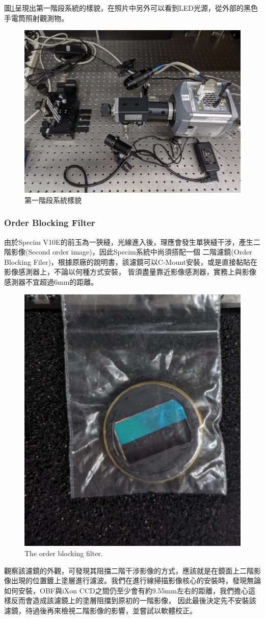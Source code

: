 \documentclass[12pt]{article}
\begin{document}
圖\ref{figure: 1 stage setup}呈現出第一階段系統的樣貌，在照片中另外可以看到LED光源，從外部的黑色手電筒照射觀測物。
\begin{figure}[h]
    \centering
    \includegraphics[width=0.65\linewidth]{PXL_20210723_094307842.jpg}
    \caption{第一階段系統樣貌}
    \label{figure: 1 stage setup}
\end{figure}

\subsubsection{Order Blocking Filter} \label{sec: OBF}
由於Specim V10E的前玉為一狹縫，光線進入後，理應會發生單狹縫干涉，產生二階影像(Second order image)，因此Specim系統中尚須搭配一個
二階濾鏡(Order Blocking Filer)，根據原廠的說明書，該濾鏡可以C-Mount安裝，或是直接黏貼在影像感測器上，不論以何種方式安裝，
皆須盡量靠近影像感測器，實務上與影像感測器不宜超過6mm的距離\cite{manual}。
\begin{figure}[h]
    \centering
    \includegraphics[width=0.5\linewidth]{PXL_20210723_094341395.jpg}
    \caption{The order blocking filter.}
    \label{figure: obf}
\end{figure}
觀察該濾鏡的外觀，可發現其阻擋二階干涉影像的方式，應該就是在鏡面上二階影像出現的位置鍍上塗層進行濾波。我們在進行線掃描影像核心的安裝時，發現無論如何安裝，OBF與iXon CCD之間仍至少會有約9.55mm左右的距離，我們擔心這樣反而會造成該濾鏡上的塗層阻擋到原初的一階影像，
因此最後決定先不安裝該濾鏡，待過後再來檢視二階影像的影響，並嘗試以軟體校正。
\end{document}
